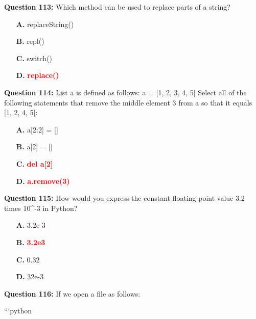 \documentclass[12pt,a4paper]{article}
\begin{document}
\vspace{0.5cm}

\textbf{Question 113:} Which method can be used to replace parts of a string?

\begin{itemize}
    \item[\textbf{A.}] replaceString()
    \item[\textbf{B.}] repl()
    \item[\textbf{C.}] switch()
    \item[\textbf{D.}] \textcolor{red}{\textbf{replace()}}
\end{itemize}

\vspace{0.5cm}

\textbf{Question 114:} List a is defined as follows: a = [1, 2, 3, 4, 5] Select all of the following statements that remove the middle element 3 from a so that it equals [1, 2, 4, 5]:

\begin{itemize}
    \item[\textbf{A.}] a[2:2] = []
    \item[\textbf{B.}] a[2] = []
    \item[\textbf{C.}] \textcolor{red}{\textbf{del a[2]}}
    \item[\textbf{D.}] \textcolor{red}{\textbf{a.remove(3)}}
\end{itemize}

\vspace{0.5cm}

\textbf{Question 115:} How would you express the constant floating-point value 3.2 times 10^-3 in Python?

\begin{itemize}
    \item[\textbf{A.}] 3.2e-3
    \item[\textbf{B.}] \textcolor{red}{\textbf{3.2e3}}
    \item[\textbf{C.}] 0.32
    \item[\textbf{D.}] 32e-3
\end{itemize}

\vspace{0.5cm}

\textbf{Question 116:} If we open a file as follows:\newline

\newline
\newline

\newline
```python\newline
\end{document}
